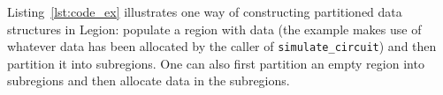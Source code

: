 

Listing~\ref{lst:code_ex} illustrates one way of constructing partitioned
data structures in Legion: populate a region with data (the example
makes use of whatever data has been allocated by the caller of {\tt simulate\_circuit})
and then partition it into subregions.  One can also first partition an empty region into subregions
and then allocate data in the subregions. 






